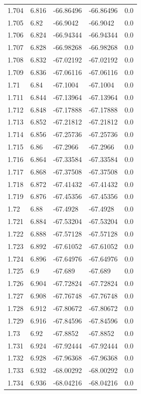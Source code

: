 \begin{tabular}{lllll}
1.704 & 6.816 & -66.86496 & -66.86496 & 0.0 \\
1.705 & 6.82 & -66.9042 & -66.9042 & 0.0 \\
1.706 & 6.824 & -66.94344 & -66.94344 & 0.0 \\
1.707 & 6.828 & -66.98268 & -66.98268 & 0.0 \\
1.708 & 6.832 & -67.02192 & -67.02192 & 0.0 \\
1.709 & 6.836 & -67.06116 & -67.06116 & 0.0 \\
1.71 & 6.84 & -67.1004 & -67.1004 & 0.0 \\
1.711 & 6.844 & -67.13964 & -67.13964 & 0.0 \\
1.712 & 6.848 & -67.17888 & -67.17888 & 0.0 \\
1.713 & 6.852 & -67.21812 & -67.21812 & 0.0 \\
1.714 & 6.856 & -67.25736 & -67.25736 & 0.0 \\
1.715 & 6.86 & -67.2966 & -67.2966 & 0.0 \\
1.716 & 6.864 & -67.33584 & -67.33584 & 0.0 \\
1.717 & 6.868 & -67.37508 & -67.37508 & 0.0 \\
1.718 & 6.872 & -67.41432 & -67.41432 & 0.0 \\
1.719 & 6.876 & -67.45356 & -67.45356 & 0.0 \\
1.72 & 6.88 & -67.4928 & -67.4928 & 0.0 \\
1.721 & 6.884 & -67.53204 & -67.53204 & 0.0 \\
1.722 & 6.888 & -67.57128 & -67.57128 & 0.0 \\
1.723 & 6.892 & -67.61052 & -67.61052 & 0.0 \\
1.724 & 6.896 & -67.64976 & -67.64976 & 0.0 \\
1.725 & 6.9 & -67.689 & -67.689 & 0.0 \\
1.726 & 6.904 & -67.72824 & -67.72824 & 0.0 \\
1.727 & 6.908 & -67.76748 & -67.76748 & 0.0 \\
1.728 & 6.912 & -67.80672 & -67.80672 & 0.0 \\
1.729 & 6.916 & -67.84596 & -67.84596 & 0.0 \\
1.73 & 6.92 & -67.8852 & -67.8852 & 0.0 \\
1.731 & 6.924 & -67.92444 & -67.92444 & 0.0 \\
1.732 & 6.928 & -67.96368 & -67.96368 & 0.0 \\
1.733 & 6.932 & -68.00292 & -68.00292 & 0.0 \\
1.734 & 6.936 & -68.04216 & -68.04216 & 0.0 \\

\end{tabular}
